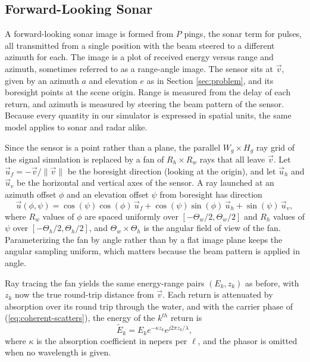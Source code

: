\documentclass[sensors,article,submit,moreauthors]{Definitions/mdpi}
\begin{document}
\subsection{Forward-Looking Sonar}
\label{sec:forward-looking}

A forward-looking sonar image is formed from $P$ pings, the sonar term for
pulses, all transmitted
from a single position with the beam steered to a different azimuth for each.
The image is a plot of received energy versus range and azimuth, sometimes referred
to as a range-angle image. The sensor sits at
$\vec{v}$, given by an azimuth $a$ and elevation $e$ as in Section
\ref{sec:problem}, and its
boresight points at the scene origin. Range is measured from the delay of each
return, and azimuth
is measured by steering the beam pattern of the sensor. Because every quantity
in our simulator is
expressed in spatial units, the same model applies to sonar and radar alike.

Since the sensor is a point rather than a plane, the parallel $W_g \times H_g$
ray grid of the
signal simulation is replaced by a fan of $R_h \times R_w$ rays that all leave
$\vec{v}$. Let
$\vec{u}_f = -\vec{v}/\lVert\vec{v}\rVert$ be the boresight direction (looking
at the origin), and let $\vec{u}_h$ and
$\vec{u}_v$ be the horizontal and vertical axes of the sensor. A ray launched at
an azimuth
offset $\phi$ and an elevation offset $\psi$ from boresight has direction
\begin{equation}
    \vec{u}(\phi,\psi) =\cos(\psi)\cos(\phi)\,\vec{u}_f +
    \cos(\psi)\sin(\phi)\,\vec{u}_h + \sin(\psi)\,\vec{u}_v
    ,
    \label{eq:ray-fan}
\end{equation}
where $R_w$ values of $\phi$ are spaced uniformly over
$[-\Theta_w/2,\Theta_w/2]$ and $R_h$ values
of $\psi$ over $[-\Theta_h/2,\Theta_h/2]$, and $\Theta_w \times \Theta_h$ is the
angular field of
view of the fan. Parameterizing the fan by angle rather than by a flat image
plane keeps the
angular sampling uniform, which matters because the beam pattern is applied in
angle.

Ray tracing the fan yields the same energy-range pairs $(E_k,z_k)$ as before,
with $z_k$ now the
true round-trip distance from $\vec{v}$. Each return is attenuated by absorption
over its round
trip through the water, and with the carrier phase of
(\ref{eq:coherent-scatters}), the energy of
the $k^{th}$ return is
\begin{equation}
    \tilde{E}_k = E_k e^{-\kappa z_k}e^{j 2 \pi z_k / \lambda}
    ,
    \label{eq:sonar-energy}
\end{equation}
where $\kappa$ is the absorption coefficient in nepers per $\ell$, and the
phasor is omitted when no
wavelength is given.
\end{document}
